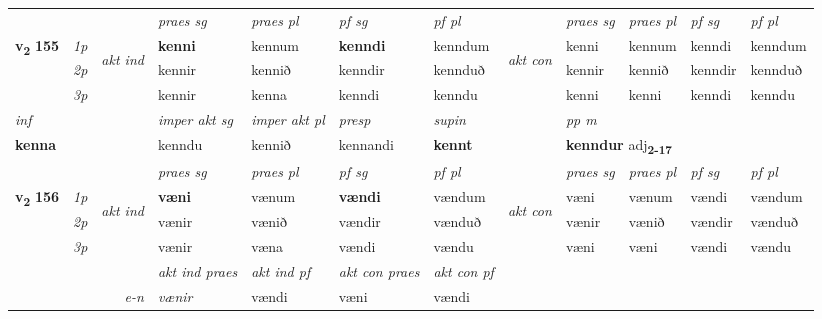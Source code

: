 \begin{longtable}[l]{X>{\footnotesize\itshape}llXXXXlXXXX}
 & &   & \textit{praes sg}  & \textit{praes pl}    & \textit{ pf sg} & \textit{pf pl} & & \textit{praes sg}  & \textit{praes pl}    & \textit{pf sg} & \textit{pf pl }  \\ \cmidrule{4-7} \cmidrule{9-12}
 \multirow{2}{*}{{{\textbf{v{\textsubscript{2}}} \Large{\textbf{155}}}}}  & 1p & \multirow{3}{*}{\begin{turn}{90}\textit{akt ind}\end{turn}} & \textbf{kenni} & kennum & \textbf{kenndi} & kenndum & \multirow{3}{*}{\begin{turn}{90}\textit{akt con}\end{turn}} &kenni & kennum & kenndi & kenndum\\*
 & 2p &  &  kennir  & kennið & kenndir & kennduð & & kennir & kennið & kenndir & kennduð \\*
 & 3p &  & kennir & kenna & kenndi & kenndu & & kenni & kenni& kenndi & kenndu \\*
\cmidrule{4-7} \cmidrule{9-12}

   {\textit{inf}} & &  & \textit{imper akt sg} & \textit{imper akt pl}   & \textit{presp} & \textit{supin}  && \textit{pp m} \\*
  {\textbf{kenna}} & && kenndu  & kennið   & kennandi &  \textbf{kennt}  && \multicolumn{2}{l}{\textbf{kenndur} adj\textbf{\textsubscript{2-17}}} \\*

\midrule

 & &   & \textit{praes sg}  & \textit{praes pl}    & \textit{ pf sg} & \textit{pf pl} & & \textit{praes sg}  & \textit{praes pl}    & \textit{pf sg} & \textit{pf pl }  \\ \cmidrule{4-7} \cmidrule{9-12}
 \multirow{2}{*}{{{\textbf{v{\textsubscript{2}}} \Large{\textbf{156}}}}}  & 1p & \multirow{3}{*}{\begin{turn}{90}\textit{akt ind}\end{turn}} & \textbf{væni} & vænum & \textbf{vændi} & vændum & \multirow{3}{*}{\begin{turn}{90}\textit{akt con}\end{turn}} &væni & vænum & vændi & vændum\\*
 & 2p &  &  vænir  & vænið & vændir & vænduð & & vænir & vænið & vændir & vænduð \\*
 & 3p &  & vænir & væna & vændi & vændu & & væni & væni& vændi & vændu \\*
\cmidrule{4-7} \cmidrule{9-12}

   && &  \textit{akt ind praes} & \textit{akt ind pf} & \textit{akt con praes} & \textit{akt con pf} \\*
\multicolumn{3}{r}{\textit{e-n}} & vænir & vændi & væni & vændi \\*


\end{longtable}
